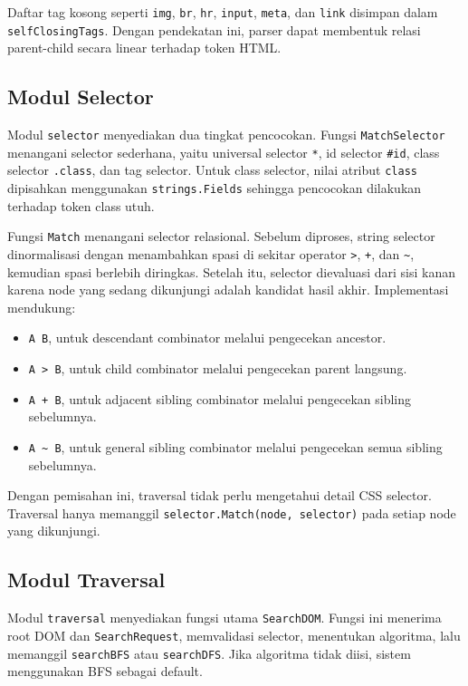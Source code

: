 Daftar tag kosong seperti \texttt{img}, \texttt{br}, \texttt{hr}, \texttt{input}, \texttt{meta}, dan \texttt{link} disimpan dalam \texttt{selfClosingTags}. Dengan pendekatan ini, parser dapat membentuk relasi parent-child secara linear terhadap token HTML.

\subsection{Modul Selector}

Modul \texttt{selector} menyediakan dua tingkat pencocokan. Fungsi \texttt{MatchSelector} menangani selector sederhana, yaitu universal selector \texttt{*}, id selector \texttt{\#id}, class selector \texttt{.class}, dan tag selector. Untuk class selector, nilai atribut \texttt{class} dipisahkan menggunakan \texttt{strings.Fields} sehingga pencocokan dilakukan terhadap token class utuh.

Fungsi \texttt{Match} menangani selector relasional. Sebelum diproses, string selector dinormalisasi dengan menambahkan spasi di sekitar operator \texttt{>}, \texttt{+}, dan \texttt{\textasciitilde{}}, kemudian spasi berlebih diringkas. Setelah itu, selector dievaluasi dari sisi kanan karena node yang sedang dikunjungi adalah kandidat hasil akhir. Implementasi mendukung:

\begin{itemize}
    \item \texttt{A B}, untuk descendant combinator melalui pengecekan ancestor.
    \item \texttt{A > B}, untuk child combinator melalui pengecekan parent langsung.
    \item \texttt{A + B}, untuk adjacent sibling combinator melalui pengecekan sibling sebelumnya.
    \item \texttt{A \textasciitilde{} B}, untuk general sibling combinator melalui pengecekan semua sibling sebelumnya.
\end{itemize}

Dengan pemisahan ini, traversal tidak perlu mengetahui detail CSS selector. Traversal hanya memanggil \texttt{selector.Match(node, selector)} pada setiap node yang dikunjungi.

\subsection{Modul Traversal}

Modul \texttt{traversal} menyediakan fungsi utama \texttt{SearchDOM}. Fungsi ini menerima root DOM dan \texttt{SearchRequest}, memvalidasi selector, menentukan algoritma, lalu memanggil \texttt{searchBFS} atau \texttt{searchDFS}. Jika algoritma tidak diisi, sistem menggunakan BFS sebagai default.

